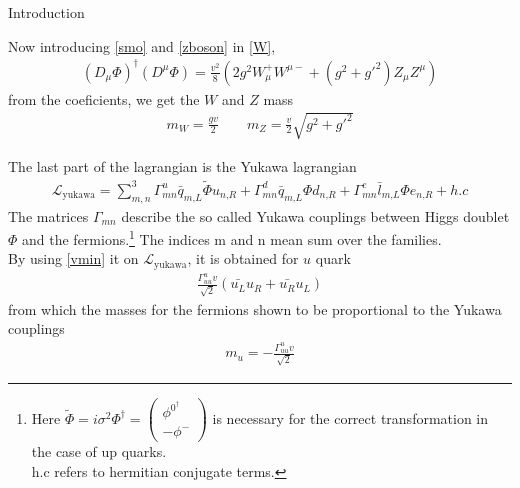 \begin{chapter}{Introduction}

Now introducing \ref{smo} and \ref{zboson} in \ref{W},
\begin{align}
(D_\mu \Phi)^\dagger (D^\mu \Phi)=\frac{v^2}{8}\left(2g^2 W_\mu^+ W^{\mu-} + (g^2+g'^2)Z_\mu Z^\mu  \right)  
\end{align}
from the coeficients, we get the $W$ and $Z$ mass  
\begin{align}
m_W=\frac{gv}{2} \qquad  m_Z=\frac{v}{2}\sqrt{g^2+g'^2}
\end{align}


The last part of the lagrangian is the Yukawa lagrangian
\begin{align}
\mathcal{L}_\text{yukawa}=\sum_{m,n}^{3}  \Gamma^u_{mn}\bar{q}_{m\text{,}L} \tilde{\Phi} u_{n\text{,}R}+\Gamma^d_{mn}\bar{q}_{m\text{,}L} \Phi d_{n\text{,}R}+\Gamma^e_{mn}\bar{l}_{m\text{,}L} \Phi e_{n\text{,}R}+h.c
\end{align}
The matrices $\Gamma_{mn}$ describe the so called Yukawa couplings between Higgs doublet $\Phi$ and the fermions.\footnote{Here $
	\tilde{\Phi}=i\sigma^2 \Phi^\dagger =\left(\begin{array}{c}
	\phi^{0^\dagger} \\
	-\phi^-
	\end{array} \right)$
	 is necessary for the correct transformation in the case of up quarks. \\
h.c refers to hermitian conjugate terms.  }  The indices  m and n mean sum over the families. \\
  

By using \ref{vmin} it on $\mathcal{L}_\text{yukawa}$, it is obtained for $u$ quark
\begin{align*}
\frac{\Gamma^u_{uu}v}{\sqrt{2}}(\bar{u_L}u_R+\bar{u_R}u_L)
\end{align*}
from which the masses for the fermions shown to be proportional to the Yukawa couplings
\begin{align*}
m_u=-\frac{\Gamma^u_{uu}v}{\sqrt{2}}
\end{align*}
 
\pagebreak




\end{chapter}
